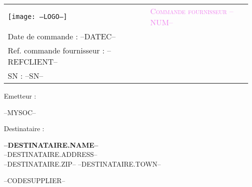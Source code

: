 \newcommand{\FOOT}{--FOOT--}

\newcommand{\specialcell}[2][c]{
	\parbox[#1]{6.3cm}{#2}}
	
\begin{tabular}{p{9cm} p{8cm}}
    \vspace{0pt} 
    \texttt{[image: --LOGO--]}
    & 
    \vspace{0pt}
   \raggedleft
	\textcolor{violet}{\textsc{\Large Commande fournisseur --NUM--}}\\
	Date de commande : --DATEC--\\
	Ref. commande fournisseur : --REFCLIENT--\\
	SN : --SN--\\
\end{tabular}


\begin{minipage}[t]{0.40\textwidth}
{\small Emetteur :}\\
\begin{fminipage}
--MYSOC--
\end{fminipage}
\end{minipage}
\hspace{1cm}
\begin{minipage}[t]{0.52\textwidth}
{\small Destinataire :}

\begin{fminipage}
\textbf{\large --DESTINATAIRE.NAME--}\\
--DESTINATAIRE.ADDRESS--\\
\textsc{--DESTINATAIRE.ZIP-- --DESTINATAIRE.TOWN--}\\
\begin{minipage}{\textwidth}
\flushright
{\tiny --CODESUPPLIER--}
\end{minipage}
\end{fminipage}
\end{minipage}

